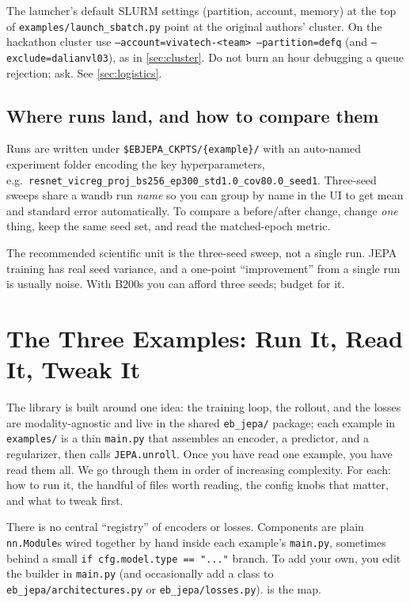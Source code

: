 \documentclass{article}
\newcommand{\code}[1]{\texttt{\small #1}}
\newcommand{\file}[1]{\texttt{\small #1}}
\begin{document}
\begin{gotchabox}
The launcher's default SLURM settings (partition, account, memory) at the top of
\file{examples/launch\_sbatch.py} point at the original authors' cluster. On the
hackathon cluster use \code{--account=vivatech-<team> --partition=defq} (and
\code{--exclude=dalianvl03}), as in \cref{sec:cluster}. Do not burn an hour
debugging a queue rejection; ask. See \cref{sec:logistics}.
\end{gotchabox}

\subsection{Where runs land, and how to compare them}

Runs are written under \code{\$EBJEPA\_CKPTS/\{example\}/} with an auto-named
experiment folder encoding the key hyperparameters, e.g.\
\code{resnet\_vicreg\_proj\_bs256\_ep300\_std1.0\_cov80.0\_seed1}. Three-seed
sweeps share a wandb run \emph{name} so you can group by name in the UI to get
mean and standard error automatically. To compare a before/after change, change
\emph{one} thing, keep the same seed set, and read the matched-epoch metric.

\begin{tipbox}
The recommended scientific unit is the three-seed sweep, not a single run. JEPA
training has real seed variance, and a one-point ``improvement'' from a single
run is usually noise. With B200s you can afford three seeds; budget for it.
\end{tipbox}
\section{The Three Examples: Run It, Read It, Tweak It}
\label{sec:examples}

The library is built around one idea: the training loop, the rollout, and the
losses are modality-agnostic and live in the shared \file{eb\_jepa/} package; each
example in \file{examples/} is a thin \file{main.py} that assembles an encoder, a
predictor, and a regularizer, then calls \code{JEPA.unroll}. Once you have read
one example, you have read them all. We go through them in order of increasing
complexity. For each: how to run it, the handful of files worth reading, the
config knobs that matter, and what to tweak first.

\begin{notebox}
There is no central ``registry'' of encoders or losses. Components are plain
\code{nn.Module}s wired together by hand inside each example's \file{main.py},
sometimes behind a small \code{if cfg.model.type == "..."} branch. To add your
own, you edit the builder in \file{main.py} (and occasionally add a class to
\file{eb\_jepa/architectures.py} or \file{eb\_jepa/losses.py}). 
is the map.
\end{notebox}
\end{document}

